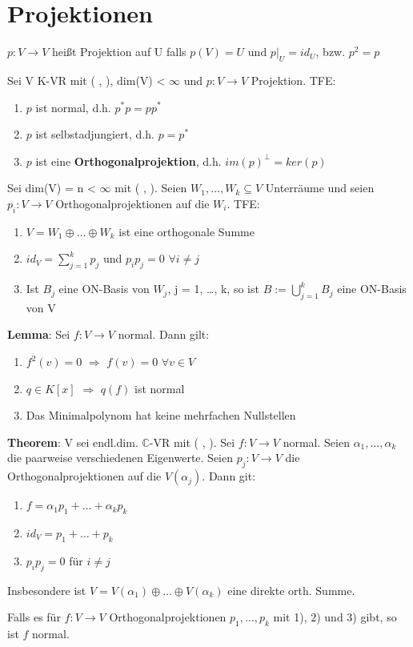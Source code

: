 \section{Projektionen}
$p: V \to V$ heißt Projektion auf U falls $p(V) = U$ und $p|_U = id_U$, bzw. $p^2 = p$
\begin{compactitem}
\item Sei V K-VR mit ( , ), dim(V) < $\infty$ und $p: V \to V$ Projektion. TFE:
\begin{enumerate}
\item $p$ ist normal, d.h. $p^*p = pp^*$
\item $p$ ist selbstadjungiert, d.h. $p = p^*$
\item $p$ ist eine \textbf{Orthogonalprojektion}, d.h. $im(p)^\perp = ker(p)$
\end{enumerate}
\item Sei dim(V) = n < $\infty$ mit ( , ). Seien $W_1, …, W_k \subseteq V$ Unterräume und seien $p_i: V \to V$ Orthogonalprojektionen auf die $W_i$. TFE:
\begin{enumerate}
\item $V = W_1 \oplus … \oplus W_k$ ist eine orthogonale Summe
\item $id_V = \sum\limits_{j=1}^k p_j$ und $p_ip_j = 0$ $\forall i \neq j$
\item Ist $B_j$ eine ON-Basis von $W_j$, j = 1, …, k, so ist $B := \bigcup\limits_{j=1}^k B_j$ eine ON-Basis von V 
\end{enumerate}
\item \textbf{Lemma}: Sei $f: V \to V$ normal. Dann gilt:
\begin{enumerate}
\item $f^2(v) = 0$ $\Rightarrow$ $f(v) = 0$ $\forall v \in V$
\item $q \in K[x]$ $\Rightarrow$ $q(f)$ ist normal
\item Das Minimalpolynom hat keine mehrfachen Nullstellen
\end{enumerate}
\item \textbf{Theorem}: V sei endl.dim. $\mathbb{C}$-VR mit ( , ). Sei $f: V \to V$ normal. Seien $\alpha_1, …, \alpha_k$ die paarweise verschiedenen Eigenwerte. Seien $p_j: V \to V$ die Orthogonalprojektionen auf die $V(\alpha_j)$. Dann git:
\begin{enumerate}
\item $f = \alpha_1p_1 + … + \alpha_kp_k$
\item $id_V = p_1 + … + p_k$
\item $p_ip_j = 0$ für $i \neq j$
\end{enumerate}
Insbesondere ist $V = V(\alpha_1) \oplus … \oplus V(\alpha_k)$ eine direkte orth. Summe.

\begin{remark}
Falls es für $f: V \to V$ Orthogonalprojektionen $p_1, …, p_k$ mit 1), 2) und 3) gibt, so ist $f$ normal.
\end{remark}
\end{compactitem}

